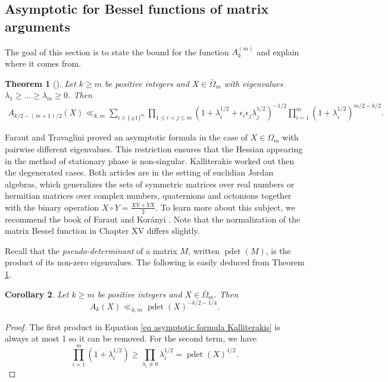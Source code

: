 \documentclass[oneside]{amsart}
\numberwithin{equation}{section}
\newtheorem{theorem}{Theorem}[section]
\newtheorem{corollary}[theorem]{Corollary}
\theoremstyle{definition}
\theoremstyle{remark}
\theoremstyle{remark}
\DeclareMathOperator{\pdet}{pdet}
\begin{document}
\subsection{Asymptotic for Bessel functions of matrix arguments}\label{sec Bessel functions}

The goal of this section is to state the bound for the function $A_k^{(m)}$ and explain where it comes from.

\begin{theorem}[\cite{FT87,Kal01}]\label{thm asymptotic formula Kalliterakis}
Let $k\geq m$ be positive integers and $X\in\bar\Omega_m$ with eigenvalues $\lambda_1\geq\dots\geq\lambda_m\geq0$. Then
\begin{align}\label{eq asymptotic formula Kalliterakis}
A_{k/2-(m+1)/2}(X)\ll_{k,m}\sum_{\epsilon\in\{\pm1\}^m}\prod_{1\leq i<j\leq m}\left(1+\lambda_i^{1/2}+\epsilon_i\epsilon_j\lambda_j^{1/2}\right)^{-1/2}\prod_{i=1}^m(1+\lambda_i^{1/2})^{m/2-k/2}.
\end{align}
\end{theorem}

Faraut and Travaglini proved an asymptotic formula in the case of $X\in\Omega_m$ with pairwise different eigenvalues. This restriction ensures that the Hessian appearing in the method of stationary phase is non-singular. Kalliterakis worked out then the degenerated cases. Both articles are in the setting of euclidian Jordan algebras, which generalizes the sets of symmetric matrices over real numbers or hermitian matrices over complex numbers, quaternions and octonions together with the binary operation $X\circ Y=\frac{XY+YX}2$. To learn more about this subject, we recommend the book of Faraut and Korányi \cite{FK94}. Note that the normalization of the matrix Bessel function in Chapter XV differs slightly.

Recall that the \emph{pseudo-determinant} of a matrix $M$, written $\pdet(M)$, is the product of its non-zero eigenvalues. The following is easily deduced from Theorem \ref{thm asymptotic formula Kalliterakis}.
\begin{corollary}
Let $k\geq m$ be positive integers and $X\in\bar\Omega_m$. Then
$$A_k(X)\ll_{k,m}\pdet(X)^{-k/2-1/4}.$$
\end{corollary}

\begin{proof}
The first product in Equation \eqref{eq asymptotic formula Kalliterakis} is always at most 1 so it can be removed. For the second term, we have
$$\prod_{i=1}^m(1+\lambda_i^{1/2})\geq\prod_{\lambda_i\neq0}\lambda_i^{1/2}=\pdet(X)^{1/2}.$$
\end{proof}
\end{document}
